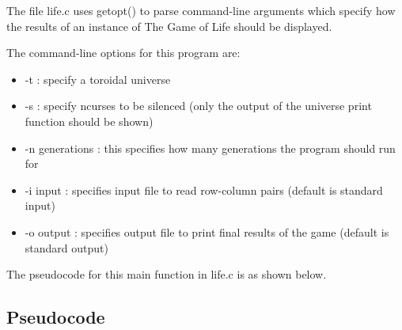 \documentclass[11pt]{article}
\begin{document}
The file life.c uses getopt() to parse command-line arguments which specify how the results of an instance of The Game of Life should be displayed. 

The command-line options for this program are:
\begin{itemize}
    \item -t : specify a toroidal universe
    \item -s : specify ncurses to be silenced (only the output of the universe 
    print function should be shown)
    \item -n generations : this specifies how many generations the program should run for
    \item -i input : specifies input file to read row-column pairs (default is standard
    input)
    \item -o output : specifies output file to print final results of the game (default is standard output)
\end{itemize}
The pseudocode for this main function in life.c is as shown below.

\subsection{Pseudocode}
\end{document}
